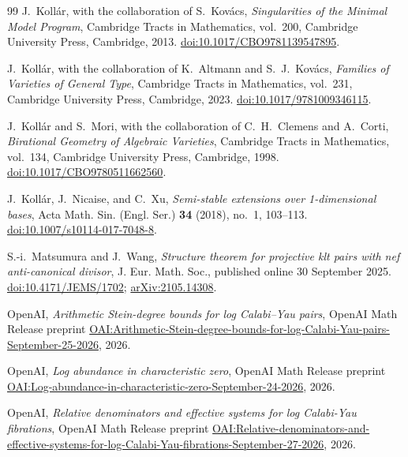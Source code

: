\begin{thebibliography}{99}
J.~Koll\'ar, with the collaboration of S.~Kov\'acs,
\emph{Singularities of the Minimal Model Program},
Cambridge Tracts in Mathematics, vol.~200,
Cambridge University Press, Cambridge, 2013.
\href{https://doi.org/10.1017/CBO9781139547895}{doi:10.1017/CBO9781139547895}.

J.~Koll\'ar, with the collaboration of K.~Altmann and S.~J.~Kov\'acs,
\emph{Families of Varieties of General Type},
Cambridge Tracts in Mathematics, vol.~231,
Cambridge University Press, Cambridge, 2023.
\href{https://doi.org/10.1017/9781009346115}{doi:10.1017/9781009346115}.

J.~Koll\'ar and S.~Mori, with the collaboration of C.~H.~Clemens and A.~Corti,
\emph{Birational Geometry of Algebraic Varieties},
Cambridge Tracts in Mathematics, vol.~134,
Cambridge University Press, Cambridge, 1998.
\href{https://doi.org/10.1017/CBO9780511662560}{doi:10.1017/CBO9780511662560}.

J.~Koll\'ar, J.~Nicaise, and C.~Xu,
\emph{Semi-stable extensions over 1-dimensional bases},
Acta Math. Sin. (Engl. Ser.) \textbf{34} (2018), no.~1, 103--113.
\href{https://doi.org/10.1007/s10114-017-7048-8}{doi:10.1007/s10114-017-7048-8}.

S.-i.~Matsumura and J.~Wang,
\emph{Structure theorem for projective klt pairs with nef anti-canonical divisor},
J. Eur. Math. Soc., published online 30 September 2025.
\href{https://doi.org/10.4171/JEMS/1702}{doi:10.4171/JEMS/1702};
\href{https://arxiv.org/abs/2105.14308}{arXiv:2105.14308}.

OpenAI, \emph{Arithmetic Stein-degree bounds for log Calabi--Yau pairs},
OpenAI Math Release preprint
\href{https://github.com/openai/math/blob/main/preprints/Arithmetic-Stein-degree-bounds-for-log-Calabi-Yau-pairs-September-25-2026/paper.pdf}{OAI:Arithmetic-Stein-degree-bounds-for-log-Calabi-Yau-pairs-September-25-2026},
2026.

OpenAI, \emph{Log abundance in characteristic zero},
OpenAI Math Release preprint
\href{https://github.com/openai/math/blob/main/preprints/Log-abundance-in-characteristic-zero-September-24-2026/paper.pdf}{OAI:Log-abundance-in-characteristic-zero-September-24-2026},
2026.

OpenAI, \emph{Relative denominators and effective systems for log Calabi-Yau fibrations},
OpenAI Math Release preprint
\href{https://github.com/openai/math/blob/main/preprints/Relative-denominators-and-effective-systems-for-log-Calabi-Yau-fibrations-September-27-2026/paper.pdf}{OAI:Relative-denominators-and-effective-systems-for-log-Calabi-Yau-fibrations-September-27-2026},
2026.


\end{thebibliography}
